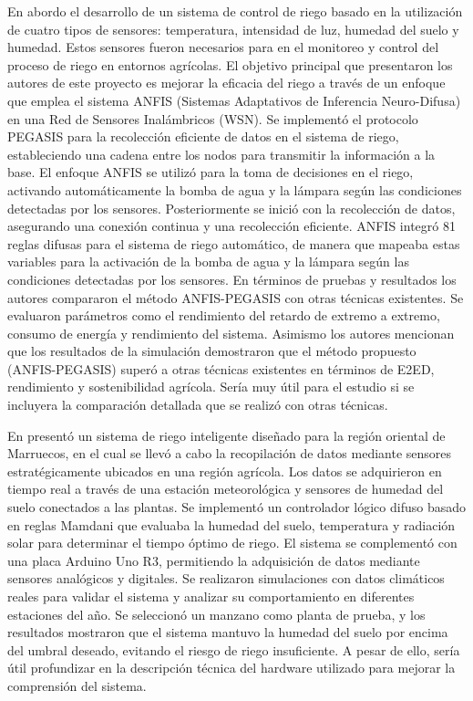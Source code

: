 \bigbreak
En \cite{kumar_irrigation_2020} abordo el desarrollo de un sistema de control de riego basado en la utilización de cuatro tipos de sensores: temperatura, intensidad de luz, humedad del suelo y humedad. Estos sensores fueron necesarios para en el monitoreo y control del proceso de riego en entornos agrícolas. El objetivo principal que presentaron los autores de este proyecto es mejorar la eficacia del riego a través de un enfoque que emplea el sistema ANFIS (Sistemas Adaptativos de Inferencia Neuro-Difusa) en una Red de Sensores Inalámbricos (WSN). Se implementó el protocolo PEGASIS para la recolección eficiente de datos en el sistema de riego, estableciendo una cadena entre los nodos para transmitir la información a la base. El enfoque ANFIS se utilizó para la toma de decisiones en el riego, activando automáticamente la bomba de agua y la lámpara según las condiciones detectadas por los sensores. Posteriormente se inició con la recolección de datos, asegurando una conexión continua y una recolección eficiente. ANFIS integró 81 reglas difusas para el sistema de riego automático, de manera que mapeaba estas variables para la activación de la bomba de agua y la lámpara según las condiciones detectadas por los sensores. En términos de pruebas y resultados los autores compararon el método ANFIS-PEGASIS con otras técnicas existentes. Se evaluaron parámetros como el rendimiento del retardo de extremo a extremo, consumo de energía y rendimiento del sistema. Asimismo los autores mencionan que los resultados de la simulación demostraron que el método propuesto (ANFIS-PEGASIS) superó a otras técnicas existentes en términos de E2ED, rendimiento y sostenibilidad agrícola. Sería muy útil para el estudio si se incluyera la comparación detallada que se realizó con otras técnicas.

\bigbreak
En \cite{mohammed_intelligent_nodate} presentó un sistema de riego inteligente diseñado para la región oriental de Marruecos, en el cual se llevó a cabo la recopilación de datos mediante sensores estratégicamente ubicados en una región agrícola. Los datos se adquirieron en tiempo real a través de una estación meteorológica y sensores de humedad del suelo conectados a las plantas. Se implementó un controlador lógico difuso basado en reglas Mamdani que evaluaba la humedad del suelo, temperatura y radiación solar para determinar el tiempo óptimo de riego. El sistema se complementó con una placa Arduino Uno R3, permitiendo la adquisición de datos mediante sensores analógicos y digitales. Se realizaron simulaciones con datos climáticos reales para validar el sistema y analizar su comportamiento en diferentes estaciones del año. Se seleccionó un manzano como planta de prueba, y los resultados mostraron que el sistema mantuvo la humedad del suelo por encima del umbral deseado, evitando el riesgo de riego insuficiente. A pesar de ello, sería útil profundizar en la descripción técnica del hardware utilizado para mejorar la comprensión del sistema.

